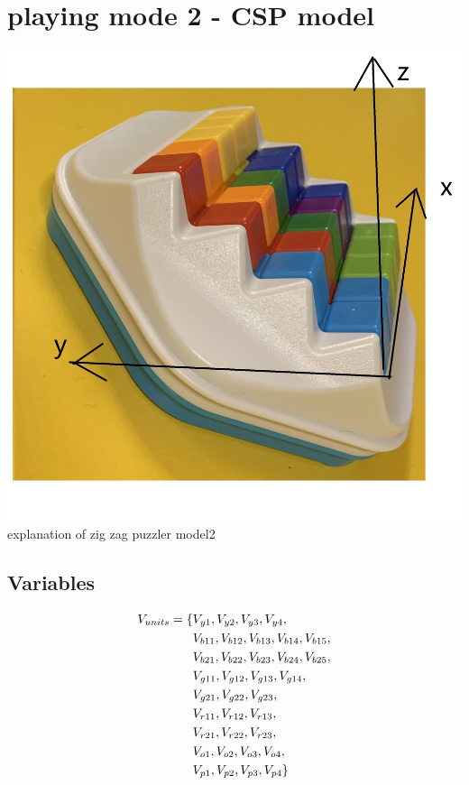 \section{playing mode 2 - CSP model}
\begin{center}
\includegraphics[scale=0.2]{ZIGZAGmodel2board.jpg} \\
explanation of zig zag puzzler model2
\end{center}
\label{sec:CSP model2}
\subsection{Variables}
\begin{align*}
V_{units}=\{&V_{y1},V_{y2},V_{y3},V_{y4},\\&V_{b11},V_{b12},V_{b13},V_{b14},
V_{b15},\\&V_{b21},V_{b22},V_{b23},V_{b24},V_{b25},\\&V_{g11},V_{g12},V_{g13},V_{g14},\\&V_{g21},V_{g22},V_{g23},\\&V_{r11},
V_{r12},V_{r13},\\&V_{r21},V_{r22},V_{r23},\\&V_{o1},V_{o2},V_{o3},V_{o4},\\&V_{p1},V_{p2},V_{p3},V_{p4}\}
\end{align*}
